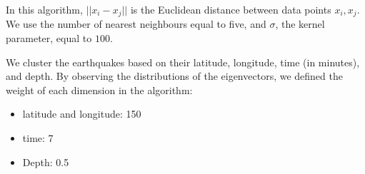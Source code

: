 In this algorithm, $||x_i-x_j||$ is the Euclidean distance between
data points $x_i,x_j$. We use the number of nearest neighbours equal to
five, and $\sigma$, the kernel parameter, equal to $100$.

We cluster the earthquakes based on their latitude, longitude, time
(in minutes), and depth. By observing the distributions of the
eigenvectors, we defined the weight of each dimension in the algorithm:

\begin{itemize}
\item latitude and longitude: 150
\item time: 7
\item Depth: 0.5
\end{itemize}
